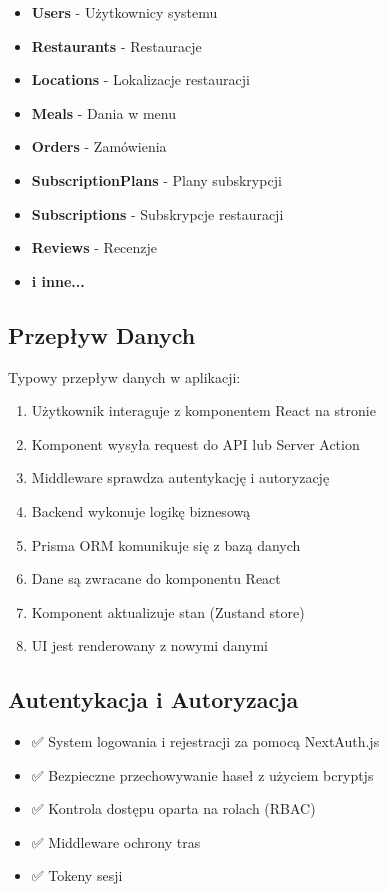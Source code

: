 ﻿\documentclass[12pt,a4paper,utf-8]{article}
\begin{document}
\begin{itemize}
    \item \textbf{Users}  -  Użytkownicy systemu
    \item \textbf{Restaurants}  -  Restauracje
    \item \textbf{Locations}  -  Lokalizacje restauracji
    \item \textbf{Meals}  -  Dania w menu
    \item \textbf{Orders}  -  Zamówienia
    \item \textbf{SubscriptionPlans}  -  Plany subskrypcji
    \item \textbf{Subscriptions}  -  Subskrypcje restauracji
    \item \textbf{Reviews}  -  Recenzje
    \item \textbf{i inne...}
\end{itemize}

\subsection{Przepływ Danych}

Typowy przepływ danych w aplikacji:

\begin{enumerate}
    \item Użytkownik interaguje z komponentem React na stronie
    \item Komponent wysyła request do API lub Server Action
    \item Middleware sprawdza autentykację i autoryzację
    \item Backend wykonuje logikę biznesową
    \item Prisma ORM komunikuje się z bazą danych
    \item Dane są zwracane do komponentu React
    \item Komponent aktualizuje stan (Zustand store)
    \item UI jest renderowany z nowymi danymi
\end{enumerate}

\newpage

\subsection{Autentykacja i Autoryzacja}

\begin{itemize}
    \item ✅ System logowania i rejestracji za pomocą NextAuth.js
    \item ✅ Bezpieczne przechowywanie haseł z użyciem bcryptjs
    \item ✅ Kontrola dostępu oparta na rolach (RBAC)
    \item ✅ Middleware ochrony tras
    \item ✅ Tokeny sesji
\end{itemize}
\end{document}

